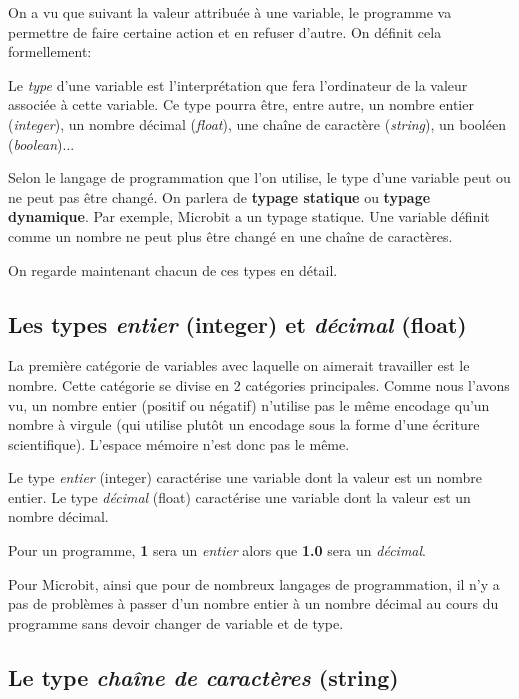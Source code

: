 \documentclass[11pt, a4paper]{book}
\begin{document}
On a vu que suivant la valeur attribuée à une variable, le programme va permettre de faire certaine action et en refuser d'autre. On définit cela formellement:

\begin{defi}
Le {\it type} d'une variable est l'interprétation que fera l'ordinateur de la valeur associée à cette variable. Ce type pourra être, entre autre, un nombre entier ({\it integer}), un nombre décimal ({\it float}), une chaîne de caractère ({\it string}), un booléen ({\it boolean})...
\end{defi}

Selon le langage de programmation que l'on utilise, le type d'une variable peut ou ne peut pas être changé. On parlera de {\bf typage statique} ou {\bf typage dynamique}. Par exemple, Microbit a un typage statique. Une variable définit comme un nombre ne peut plus être changé en une chaîne de caractères. 

On regarde maintenant chacun de ces types en détail. 



\subsection{Les types {\it entier} (integer) et {\it décimal} (float)}

La première catégorie de variables avec laquelle on aimerait travailler est le nombre. Cette catégorie se divise en 2 catégories principales. Comme nous l'avons vu, un nombre entier (positif ou négatif) n'utilise pas le même encodage qu'un nombre à virgule (qui utilise plutôt un encodage sous la forme d'une écriture scientifique). L'espace mémoire n'est donc pas le même. 

\begin{defi}
Le type {\it entier} (integer) caractérise une variable dont la valeur est un nombre entier. Le type {\it décimal} (float) caractérise une variable dont la valeur est un nombre décimal.
\end{defi}

Pour un programme, {\bf 1} sera un {\it entier} alors que {\bf 1.0} sera un {\it décimal}.

Pour Microbit, ainsi que pour de nombreux langages de programmation, il n'y a pas de problèmes à passer d'un nombre entier à un nombre décimal au cours du programme sans devoir changer de variable et de type.


\subsection{Le type {\it chaîne de caractères} (string)}
\end{document}
